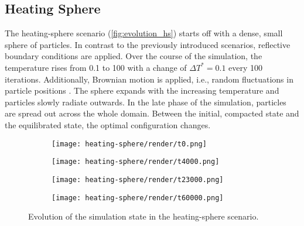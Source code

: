 \subsection{Heating Sphere}
\label{subsec:scenario_hs}
The heating-sphere scenario (\autoref{fig:evolution_hs}) starts off with a dense, small sphere of particles. In contrast to the previously introduced scenarios, reflective boundary conditions are applied. Over the course of the simulation, the temperature rises from \num{0.1} to \num{100} with a change of $\Delta \si{T^{*}}=0.1$ every \num{100} iterations. Additionally, Brownian motion is applied, i.e., random fluctuations in particle positions \cite{Moerters2010}. The sphere expands with the increasing temperature and particles slowly radiate outwards. In the late phase of the simulation, particles are spread out across the whole domain.
Between the initial, compacted state and the equilibrated state, the optimal configuration changes.

\begin{figure}[htpb]
	\centering
	\fastcolorbarhor
	\vspace*{\baselineskip}
	\begin{subfigure}{.25\textwidth}
		\texttt{[image: heating-sphere/render/t0.png]}
	\end{subfigure}%
	\begin{subfigure}{.25\textwidth}
		\texttt{[image: heating-sphere/render/t4000.png]}
	\end{subfigure}%
	\begin{subfigure}{.25\textwidth}
		\texttt{[image: heating-sphere/render/t23000.png]}
	\end{subfigure}%
	\begin{subfigure}{.25\textwidth}
		\vspace*{0.1\textwidth}
		\centering
		\texttt{[image: heating-sphere/render/t60000.png]}
		\vspace*{0.1\textwidth}
	\end{subfigure}%
	\caption{Evolution of the simulation state in the heating-sphere scenario.}
	\label{fig:evolution_hs}
\end{figure}


